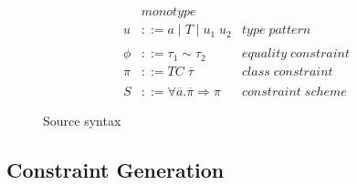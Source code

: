 \begin{figure}[h]
\begin{align*}
         &monotype \\
    u &::= a \mid T \mid u_1 \; u_2 &type \; pattern \\
    \\
    \phi &::= \tau_1 \sim \tau_2 &equality \; constraint \\
    \pi &::= TC \; \overline{\tau} &class \; constraint \\
    \\
    S &::= \forall \overline{a}. \overline{\pi} \Rightarrow \pi &constraint \;
    scheme
\end{align*}
\caption{Source syntax}
\label{source-syntax}
\end{figure}



\subsection{Constraint Generation}
